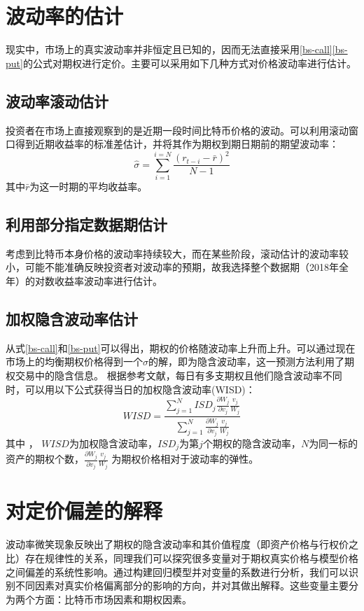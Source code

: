     \section{波动率的估计}
    现实中，市场上的真实波动率并非恒定且已知的，因而无法直接采用\ref{bs-call}\ref{bs-put}的公式对期权进行定价。主要可以采用如下几种方式对价格波动率进行估计。
    \subsection{波动率滚动估计}
    投资者在市场上直接观察到的是近期一段时间比特币价格的波动。可以利用滚动窗口得到近期收益率的标准差估计，并将其作为期权到期日期前的期望波动率：
    \begin{equation}\label{volatility-rolling}
        \hat{\sigma}=\sum_{i=1}^{i=N}\frac{(r_{t-i}-\bar{r})^2}{N-1}
    \end{equation}
    其中$\bar{r}$为这一时期的平均收益率。
    \subsection{利用部分指定数据期估计}
    考虑到比特币本身价格的波动率持续较大，而在某些阶段，滚动估计的波动率较小，可能不能准确反映投资者对波动率的预期，故我选择整个数据期（2018年全年）的对数收益率波动率进行估计。
    \subsection{加权隐含波动率估计}
    从式\ref{bs-call}和\ref{bs-put}可以得出，期权的价格随波动率上升而上升。可以通过现在市场上的均衡期权价格得到一个$\sigma$的解，即为隐含波动率，这一预测方法利用了期权交易中的隐含信息。
    根据参考文献\cite{CHIRAS1978213}，每日有多支期权且他们隐含波动率不同时，可以用以下公式获得当日的加权隐含波动率(WISD)：
    \begin{equation}
        WISD=\frac{\sum_{j=1}^{N}{ISD_j\frac{\partial{W_j}}{\partial{v_j}}\frac{v_j}{W_j}}}{\sum_{j=1}^{N}{\frac{\partial{W_j}}{\partial{v_j}}\frac{v_j}{W_j}}}
    \end{equation}
    其中 ， $WISD$为加权隐含波动率，$ISD_j$为第$j$个期权的隐含波动率，$N$为同一标的资产的期权个数，$\frac{\partial{W_j}}{\partial{v_j}}\frac{v_j}{W_j}$ 为期权价格相对于波动率的弹性。
    
    \section{对定价偏差的解释}\label{reg vars}
    波动率微笑现象反映出了期权的隐含波动率和其价值程度（即资产价格与行权价之比）存在规律性的关系，同理我们可以探究很多变量对于期权真实价格与模型价格之间偏差的系统性影响。通过构建回归模型并对变量的系数进行分析，我们可以识别不同因素对真实价格偏离部分的影响的方向，并对其做出解释。这些变量主要分为两个方面：比特币市场因素和期权因素。
